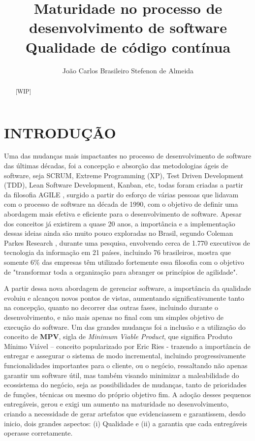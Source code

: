 \documentclass[12pt]{article}
\title{Maturidade no processo de desenvolvimento de software\\ Qualidade de código contínua }
\author{João Carlos Brasileiro Stefenon de Almeida\inst{1}}
\begin{document}
 


\maketitle

\begin{abstract}
[WIP]
\end{abstract}
   
\begin{resumo} 
[WIP]
\end{resumo}


\part{INTRODUÇÃO}

 Uma das mudanças mais impactantes no processo de desenvolvimento de software das últimas décadas, foi a concepção e absorção das metodologias ágeis de software, seja SCRUM, Extreme Programming (XP), Test Driven Development (TDD), Lean Software Development, Kanban, etc, todas foram criadas a partir da filosofia AGILE \cite{MANISFESTOAGILE}, surgido a partir do esforço de várias pessoas que lidavam com o processo de software na década de 1990, com o objetivo de definir uma abordagem mais efetiva e eficiente para o desenvolvimento de software. Apesar dos conceitos já existirem a quase 20 anos, a importância e a implementação dessas ideias ainda são muito pouco exploradas no Brasil, segundo Coleman Parkes Research \cite{COLEMANPARKES_AGILE_2017}, durante uma pesquisa, envolvendo cerca de 1.770 executivos de tecnologia da informação em 21 países, incluindo 76 brasileiros, mostra que somente 6\% das empresas têm utilizado fortemente essa filosofia com o objetivo de "transformar toda a organização para abranger os princípios de agilidade".

 A partir dessa nova abordagem de gerenciar software, a importância da qualidade evoluiu e alcançou novos pontos de vistas, aumentando significativamente tanto na concepção, quanto no decorrer das outras fases, incluindo durante o desenvolvimento, e não mais apenas no final com um simples objetivo de execução do software. Um das grandes mudanças foi a inclusão e a utilização do conceito de \textbf{MPV}, sigla de \textit{Minimum Viable Product}, que significa Produto Mínimo Viável – conceito popularizado por Eric Ries \cite{ERICRIES_THELEAN} - trazendo a importância de entregar e assegurar o sistema de modo incremental, incluindo progressivamente funcionalidades importantes para o cliente, ou o negócio, ressaltando não apenas garantir um software útil, mas também visando minimizar a maleabilidade do ecossistema do negócio, seja as possibilidades de mudanças, tanto de prioridades de funções, técnicas ou mesmo do próprio objetivo fim. A adoção desses pequenos entregáveis, gerou e exigi um aumento na maturidade no desenvolvimento, criando a necessidade de gerar artefatos que evidenciassem e garantissem, desdo inicio, dois grandes aspectos: (i) Qualidade e (ii) a garantia que cada entregáveis operasse corretamente.
\end{document}
